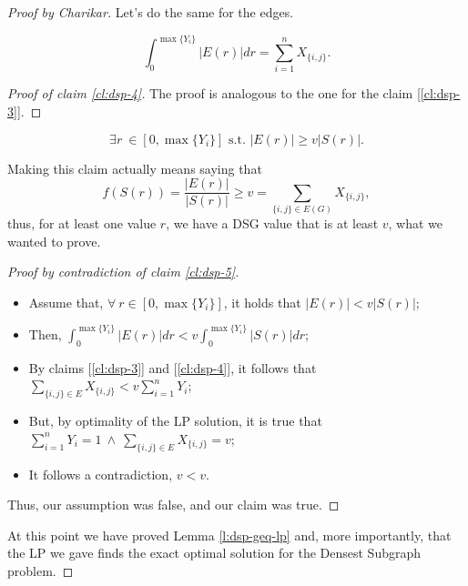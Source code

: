 \begin{proof}[Proof by Charikar]
    Let's do the same for the edges.
    
    \begin{claim}\label{cl:dsp-4}
        \begin{equation}
            \int_0^{\max{\{Y_i\}}} |E(r)|dr =
            \sum_{i=1}^n X_{\{i, j\}}.
        \end{equation}
    \end{claim}
    \begin{proof}[Proof of claim \ref{cl:dsp-4}]
        The proof is analogous to the one for the claim [\ref{cl:dsp-3}].
    \end{proof}
    
    \begin{claim}\label{cl:dsp-5}
        \begin{equation}
            \exists r\ \in [0, \max{\{Y_i\}}] \text{ s.t. } |E(r)| \geq v|S(r)|.
        \end{equation}
    \end{claim}

    Making this claim actually means saying that 
    \begin{equation}
    f(S(r)) = \frac{|E(r)|}{|S(r)|} \geq v = \sum_{\{i,j\}\in E(G)} X_{\{i, j\}},
    \end{equation}
    thus, for at least one value $r$, we have a DSG value that is at least $v$, what we wanted to prove.
    
    \begin{proof}[Proof by contradiction of claim \ref{cl:dsp-5}] \
        \begin{itemize}
            \item Assume that, $\forall\ r \in [0, \max{\{Y_i\}}]$, it holds that $|E(r)| < v|S(r)|$;
            \item Then, $\int_0^{\max{\{Y_i\}}}|E(r)| dr < v\int_0^{\max{\{Y_i\}}}|S(r)| dr$;
            \item By claims [\ref{cl:dsp-3}] and [\ref{cl:dsp-4}], it follows that $\sum_{\{i, j\} \in E} X_{\{i, j\}} < v \sum_{i = 1}^n Y_i$;
            \item But, by optimality of the LP solution, it is true that
            $\sum_{i = 1}^n Y_i = 1\ \wedge\ \sum_{\{i, j\} \in E} X_{\{i, j\}} = v$;
            \item It follows a contradiction, $ v < v$.
        \end{itemize}
        Thus, our assumption was false, and our claim was true.
    \end{proof}

    At this point we have proved Lemma \ref{l:dsp-geq-lp} and, more importantly, that the LP we gave finds the exact optimal solution for the Densest Subgraph problem.
\end{proof}

